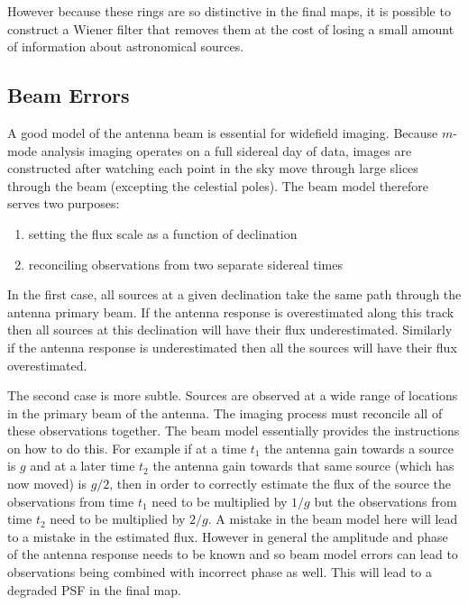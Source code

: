 \documentclass[twocolumn]{aastex61}
\newcommand{\todo}[1]{\textcolor{red}{TODO: #1}\PackageWarning{TODO:}{#1!}}
\begin{document}
However because these rings are so distinctive in the final maps, it is possible to construct a
Wiener filter that removes them at the cost of losing a small amount of information about
astronomical sources.


\subsection{Beam Errors}

A good model of the antenna beam is essential for widefield imaging. Because $m$-mode analysis
imaging operates on a full sidereal day of data, images are constructed after watching each point in
the sky move through large slices through the beam (excepting the celestial poles). The beam model
therefore serves two purposes:

\begin{enumerate}
    \item setting the flux scale as a function of declination
    \item reconciling observations from two separate sidereal times
\end{enumerate}

In the first case, all sources at a given declination take the same path through the antenna primary
beam. If the antenna response is overestimated along this track then all sources at this declination
will have their flux underestimated. Similarly if the antenna response is underestimated then all
the sources will have their flux overestimated.


The second case is more subtle. Sources are observed at a wide range of locations in the primary
beam of the antenna. The imaging process must reconcile all of these observations together. The beam
model essentially provides the instructions on how to do this. For example if at a time $t_1$ the
antenna gain towards a source is $g$ and at a later time $t_2$ the antenna gain towards that same
source (which has now moved) is $g/2$, then in order to correctly estimate the flux of the source
the observations from time $t_1$ need to be multiplied by $1/g$ but the observations from time $t_2$
need to be multiplied by $2/g$. A mistake in the beam model here will lead to a mistake in the
estimated flux.  However in general the amplitude and phase of the antenna response needs to be
known and so beam model errors can lead to observations being combined with incorrect phase as well.
This will lead to a degraded PSF in the final map.
\end{document}
